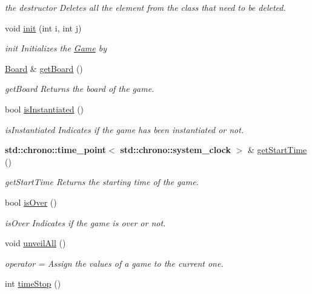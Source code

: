 \begin{DoxyCompactItemize}
\begin{DoxyCompactList}\small\item\em the destructor Deletes all the element from the class that need to be deleted. \end{DoxyCompactList}\item 
void \hyperlink{class_game_a1e71702da13cf28f77ab870b417a6866}{init} (int i, int j)
\begin{DoxyCompactList}\small\item\em init Initializes the \hyperlink{class_game}{Game} by \end{DoxyCompactList}\item 
\hyperlink{class_board}{Board} \& \hyperlink{class_game_abb01bda7e2fecca8571706abec4bc3dd}{get\+Board} ()
\begin{DoxyCompactList}\small\item\em get\+Board Returns the board of the game. \end{DoxyCompactList}\item 
bool \hyperlink{class_game_a1cb2f9034bb550c3debfced46b945d11}{is\+Instantiated} ()
\begin{DoxyCompactList}\small\item\em is\+Instantiated Indicates if the game has been instantiated or not. \end{DoxyCompactList}\item 
\textbf{ std\+::chrono\+::time\+\_\+point}$<$ \textbf{ std\+::chrono\+::system\+\_\+clock} $>$ \& \hyperlink{class_game_a85755ec9e90fdb122c9b93c706668f1a}{get\+Start\+Time} ()
\begin{DoxyCompactList}\small\item\em get\+Start\+Time Returns the starting time of the game. \end{DoxyCompactList}\item 
bool \hyperlink{class_game_ab8536df425c768f3524c87de99aa9cd9}{is\+Over} ()
\begin{DoxyCompactList}\small\item\em is\+Over Indicates if the game is over or not. \end{DoxyCompactList}\item 
void \hyperlink{class_game_a5423ce2b75acf6435cdea79c8c2b2112}{unveil\+All} ()
\begin{DoxyCompactList}\small\item\em operator = Assign the values of a game to the current one. \end{DoxyCompactList}\item 
int \hyperlink{class_game_aba2ee6adbc00f4ec492705ecaf48998a}{time\+Stop} ()

\end{DoxyCompactItemize}
